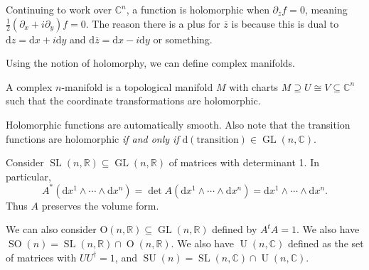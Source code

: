Continuing to work over $\mathbb{C} ^n$, a function is holomorphic when $\partial _{\overline{z} } f=0$, meaning $\frac{1}{2} (\partial _x+i \partial _y)f=0$. The reason there is a plus for $\overline{z} $ is because this is dual to $\mathrm{d} z=\mathrm{d} x+i\mathrm{d} y$ and $\mathrm{d} \overline{z} =\mathrm{d} x-i\mathrm{d} y$ or something.

Using the notion of holomorphy, we can define complex manifolds.

\begin{definition}\label{1.1.3}
	A complex $n$-manifold is a topological manifold $M$ with charts $M \supseteq U \cong V \subseteq \mathbb{C} ^n$ such that the coordinate transformations are holomorphic.
\end{definition}
Holomorphic functions are automatically smooth. Also note that the transition functions are holomorphic \emph{if and only if} $\mathrm{d} (\text{transition} )\in \operatorname{GL} (n,\mathbb{C} )$.

Consider $\operatorname{SL} (n,\mathbb{R} )\subseteq \operatorname{GL} (n,\mathbb{R} )$ of matrices with determinant 1. In particular,
\[
	A^*\left( \mathrm{d} x^1 \wedge \cdots \wedge \mathrm{d} x^n \right) =\det A\left( \mathrm{d} x^1 \wedge \cdots \wedge \mathrm{d} x^n \right) =\mathrm{d} x^1 \wedge \cdots \wedge \mathrm{d} x^n
.\]
Thus $A$ preserves the volume form.

We can also consider $\mathrm{O} (n,\mathbb{R} )\subseteq \operatorname{GL} (n,\mathbb{R} )$ defined by $A^tA=1$. We also have $\operatorname{SO}(n) =\operatorname{SL}(n,\mathbb{R} ) \cap \operatorname{O}(n,\mathbb{R} ) $. We also have $\operatorname{U} (n,\mathbb{C} )$ defined as the set of matrices with $UU^\dagger=1$, and $\operatorname{SU} (n)=\operatorname{SL} (n,\mathbb{C} )\cap \operatorname{U} (n,\mathbb{C} )$.

